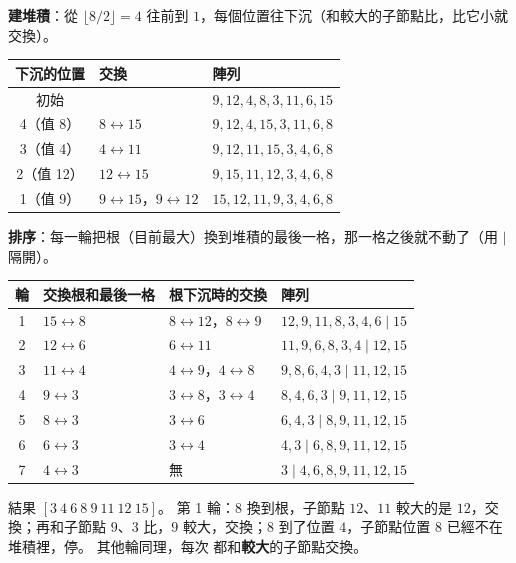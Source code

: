 \begin{pastsoln}
\textbf{建堆積}：從 $\lfloor 8/2 \rfloor = 4$ 往前到 $1$，每個位置往下沉（和較大的子節點比，比它小就交換）。
\begin{center}
\begin{tabular}{cll}
\toprule
下沉的位置 & 交換 & 陣列 \\
\midrule
初始 & & $9, 12, 4, 8, 3, 11, 6, 15$ \\
4（值 8） & $8 \leftrightarrow 15$ & $9, 12, 4, 15, 3, 11, 6, 8$ \\
3（值 4） & $4 \leftrightarrow 11$ & $9, 12, 11, 15, 3, 4, 6, 8$ \\
2（值 12） & $12 \leftrightarrow 15$ & $9, 15, 11, 12, 3, 4, 6, 8$ \\
1（值 9） & $9 \leftrightarrow 15$，$9 \leftrightarrow 12$ & $15, 12, 11, 9, 3, 4, 6, 8$ \\
\bottomrule
\end{tabular}
\end{center}
\textbf{排序}：每一輪把根（目前最大）換到堆積的最後一格，那一格之後就不動了（用 $|$ 隔開）。
\begin{center}
\begin{tabular}{clll}
\toprule
輪 & 交換根和最後一格 & 根下沉時的交換 & 陣列 \\
\midrule
1 & $15 \leftrightarrow 8$ & $8 \leftrightarrow 12$，$8 \leftrightarrow 9$ & $12, 9, 11, 8, 3, 4, 6 \mid 15$ \\
2 & $12 \leftrightarrow 6$ & $6 \leftrightarrow 11$ & $11, 9, 6, 8, 3, 4 \mid 12, 15$ \\
3 & $11 \leftrightarrow 4$ & $4 \leftrightarrow 9$，$4 \leftrightarrow 8$ & $9, 8, 6, 4, 3 \mid 11, 12, 15$ \\
4 & $9 \leftrightarrow 3$ & $3 \leftrightarrow 8$，$3 \leftrightarrow 4$ & $8, 4, 6, 3 \mid 9, 11, 12, 15$ \\
5 & $8 \leftrightarrow 3$ & $3 \leftrightarrow 6$ & $6, 4, 3 \mid 8, 9, 11, 12, 15$ \\
6 & $6 \leftrightarrow 3$ & $3 \leftrightarrow 4$ & $4, 3 \mid 6, 8, 9, 11, 12, 15$ \\
7 & $4 \leftrightarrow 3$ & 無 & $3 \mid 4, 6, 8, 9, 11, 12, 15$ \\
\bottomrule
\end{tabular}
\end{center}
結果 $[3\ 4\ 6\ 8\ 9\ 11\ 12\ 15]$。 第 1 輪：$8$ 換到根，子節點 $12$、$11$ 較大的是 $12$，交換；再和子節點
$9$、$3$ 比，$9$ 較大，交換；$8$ 到了位置 $4$，子節點位置 $8$ 已經不在堆積裡，停。 其他輪同理，每次
都和\textbf{較大}的子節點交換。
\end{pastsoln}

